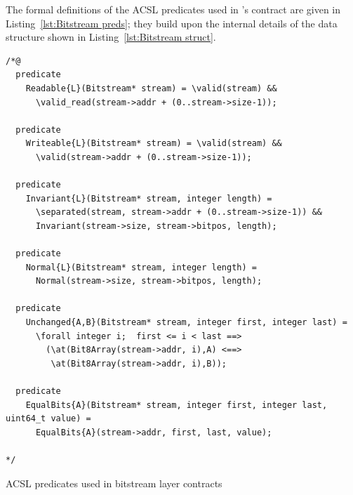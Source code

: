 The formal definitions of the ACSL predicates used
in 's contract are given in
Listing~\ref{lst:Bitstream preds}; they build upon the internal
details of the  data structure shown in
Listing~\ref{lst:Bitstream struct}.



\begin{listing}[hbt]
\begin{minipage}{0.99\textwidth}
\begin{lstlisting}[style=acsl-block]
/*@
  predicate 
    Readable{L}(Bitstream* stream) = \valid(stream) &&
      \valid_read(stream->addr + (0..stream->size-1));

  predicate
    Writeable{L}(Bitstream* stream) = \valid(stream) &&
      \valid(stream->addr + (0..stream->size-1));

  predicate
    Invariant{L}(Bitstream* stream, integer length) =
      \separated(stream, stream->addr + (0..stream->size-1)) &&
      Invariant(stream->size, stream->bitpos, length);

  predicate
    Normal{L}(Bitstream* stream, integer length) =
      Normal(stream->size, stream->bitpos, length);

  predicate
    Unchanged{A,B}(Bitstream* stream, integer first, integer last) =
      \forall integer i;  first <= i < last ==>
        (\at(Bit8Array(stream->addr, i),A) <==>
         \at(Bit8Array(stream->addr, i),B));

  predicate
    EqualBits{A}(Bitstream* stream, integer first, integer last, uint64_t value) =
      EqualBits{A}(stream->addr, first, last, value);

*/
\end{lstlisting}
\end{minipage}
\caption{\label{lst:Bitstream preds}
	ACSL predicates used in bitstream layer contracts}
\end{listing}

\FloatBarrier

